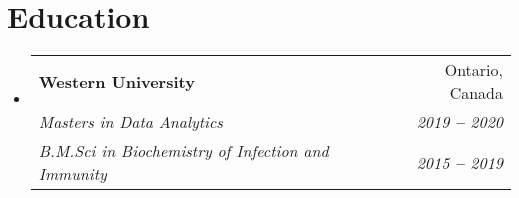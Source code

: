 \documentclass[letterpaper,10pt]{article}
\makeatletter
\newcommand{\resumeEducationHeading}[6]{
  \vspace{-2pt}\item
    \begin{tabular*}{0.97\textwidth}[t]{l@{\extracolsep{\fill}}r}
      \textbf{#1} & #2 \\
      \textit{\small#3} & \textit{\small #4} \\
      \textit{\small#5} & \textit{\small #6} \\
    \end{tabular*}\vspace{-5pt}
}
\newcommand{\resumeOrganizationHeading}[4]{
  \vspace{-2pt}\item
    \begin{tabular*}{0.97\textwidth}[t]{l@{\extracolsep{\fill}}r}
      \textbf{#1} & \textit{\small #2} \\
      \textit{\small#3}
    \end{tabular*}\vspace{-7pt}
}
\newcommand{\resumeSubHeadingListStart}{\begin{itemize}[leftmargin=0.15in, label={}]}
\newcommand{\resumeSubHeadingListEnd}{\end{itemize}}
\makeatother
\begin{document}





\section{Education}
  \vspace{3pt}
  \resumeSubHeadingListStart
    
    \resumeEducationHeading
      {Western University
      }{Ontario, Canada}
      {Masters in Data Analytics}{2019 \textbf{--} 2020}
      {B.M.Sci in Biochemistry of Infection and Immunity}{2015 \textbf{--} 2019}
    
  \resumeSubHeadingListEnd





    
    

\end{document}
